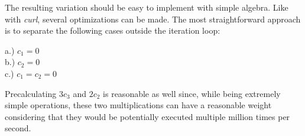 \documentclass[]{article}
\begin{document}
The resulting variation should be easy to implement with simple algebra. Like with \emph{curl}, several optimizations can be made. The most straightforward approach is to separate the following cases outside the iteration loop:

\begin{flushleft}
	\hspace{20pt} a.) $c_1 = 0$ \\	
	\hspace{20pt} b.) $c_2 = 0$ \\
	\hspace{20pt} c.) $c_1 = c_2 = 0$ \\
\end{flushleft}	

\noindent Precalculating $3c_3$ and $2c_2$ is reasonable as well since, while being extremely simple operations, these two multiplications can have a reasonable weight considering that they would be potentially executed multiple million times per second.
\end{document}
